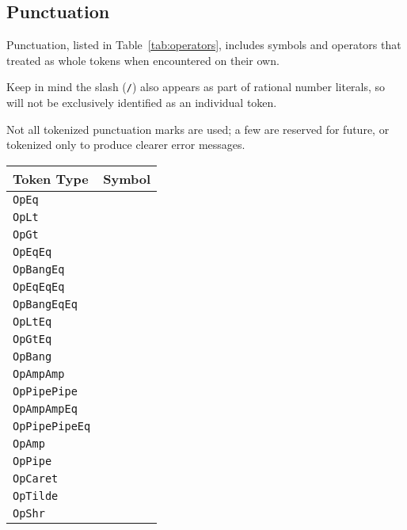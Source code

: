 \subsection{Punctuation}
\FloatBarrier

Punctuation, listed in Table~\ref{tab:operators}, includes symbols and operators that
treated as whole tokens when encountered on their own.

Keep in mind the slash (\texttt{/}) also appears as part of rational number literals, so
will not be exclusively identified as an individual token.

Not all tokenized punctuation marks are used; a few are reserved for future, or tokenized
only to produce clearer error messages.

\begin{table}[h]
\parbox[t]{0.45\linewidth}{
    \centering
    \begin{tabular}[t]{ll}
        \hline
        \textbf{Token Type} & \textbf{Symbol} \\
        \hline
        \texttt{OpEq} & \op{=} \\
        \texttt{OpLt} & \op{<} \\
        \texttt{OpGt} & \op{>} \\
        \texttt{OpEqEq} & \op{==} \\
        \texttt{OpBangEq} & \op{!=} \\
        \texttt{OpEqEqEq} & \op{===} \\
        \texttt{OpBangEqEq} & \op{!==} \\
        \texttt{OpLtEq} & \op{<=} \\
        \texttt{OpGtEq} & \op{>=} \\
        \hline
        \texttt{OpBang} & \op{!} \\
        \texttt{OpAmpAmp} & \op{\&\&} \\
        \texttt{OpPipePipe} & \op{||} \\
        \texttt{OpAmpAmpEq} & \op{\&\&=} \\
        \texttt{OpPipePipeEq} & \op{||=} \\
        \hline
        \texttt{OpAmp} & \op{\&} \\
        \texttt{OpPipe} & \op{|} \\
        \texttt{OpCaret} & \op{\textasciicircum} \\
        \texttt{OpTilde} & \op{\textasciitilde} \\
        \texttt{OpShr} & \op{\textasciitilde>} \\

\end{tabular}}
\end{table}
